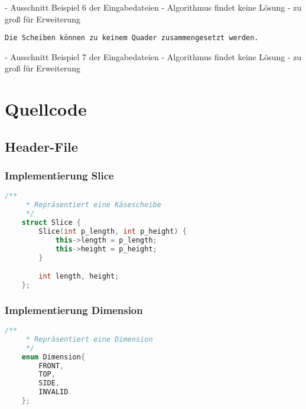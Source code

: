 \documentclass[a4paper,10pt,ngerman]{scrartcl}
\begin{document}
    - Ausschnitt Beispiel 6 der Eingabedateien
    - Algorithmus findet keine Lösung
    - zu groß für Erweiterung

    \begin{lstlisting}[frame=single, title=Programmausgabe kaese7.txt, breaklines=true,label={lst:lstlisting12}]
Die Scheiben können zu keinem Quader zusammengesetzt werden.
    \end{lstlisting}

    - Ausschnitt Beispiel 7 der Eingabedateien
    - Algorithmus findet keine Lösung
    - zu groß für Erweiterung


    \newpage


    \section{Quellcode}
    \label{sec:quellcode}
    \label{LastPage}

    \subsection{Header-File}\label{subsec:header-file}

    \subsubsection{Implementierung Slice}

    \begin{lstlisting}[frame=single,language=C++,title=Struct Slice,breaklines=true,label={lst:code_slice}]
    /**
     * Repräsentiert eine Käsescheibe
     */
    struct Slice {
        Slice(int p_length, int p_height) {
            this->length = p_length;
            this->height = p_height;
        }

        int length, height;
    };
    \end{lstlisting}

    \subsubsection{Implementierung Dimension}
    \begin{lstlisting}[frame=single,language=C++,title=Enum Dimension,breaklines=true,label={lst:code_dimension}]
    /**
     * Repräsentiert eine Dimension
     */
    enum Dimension{
        FRONT,
        TOP,
        SIDE,
        INVALID
    };
    \end{lstlisting}
\end{document}
